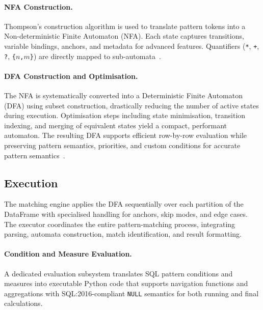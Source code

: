 \paragraph{NFA Construction.}
Thompson's construction algorithm is used to translate pattern
tokens into a Non-deterministic Finite Automaton (NFA).  Each
state captures transitions, variable bindings, anchors, and
metadata for advanced features.  Quantifiers (\texttt{*},
\texttt{+}, \texttt{?}, \texttt{\{$n$,$m$\}}) are directly
mapped to sub-automata~\cite{georgiou2025streaming}.

\paragraph{DFA Construction and Optimisation.}
The NFA is systematically converted into a Deterministic Finite
Automaton (DFA) using subset construction, drastically reducing
the number of active states during execution.  Optimisation steps
including state minimisation, transition indexing, and merging of
equivalent states yield a compact, performant automaton.  The
resulting DFA supports efficient row-by-row evaluation while
preserving pattern semantics, priorities, and custom conditions
for accurate pattern
semantics~\cite{e104-d_3_381,10.1145/986537.986588,georgiou2025streaming}.

\subsection{Execution}
\label{subsec:impl-execution}

The matching engine applies the DFA sequentially over each partition
of the DataFrame with specialised handling for anchors, skip modes,
and edge cases.  The executor coordinates the entire
pattern-matching process, integrating parsing, automata
construction, match identification, and result formatting.

\paragraph{Condition and Measure Evaluation.}
A dedicated evaluation subsystem translates SQL pattern conditions
and measures into executable Python code that supports navigation
functions and aggregations with SQL:2016-compliant \texttt{NULL}
semantics for both running and final calculations.

